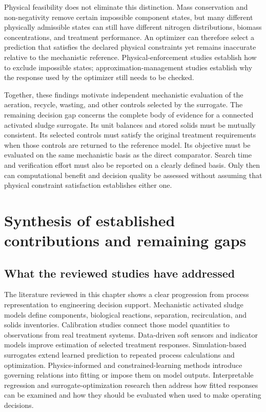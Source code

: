 Physical feasibility does not eliminate this distinction. Mass conservation and non-negativity remove certain impossible component states, but many different physically admissible states can still have different nitrogen distributions, biomass concentrations, and treatment performance. An optimizer can therefore select a prediction that satisfies the declared physical constraints yet remains inaccurate relative to the mechanistic reference. Physical-enforcement studies establish how to exclude impossible states; approximation-management studies establish why the response used by the optimizer still needs to be checked.

Together, these findings motivate independent mechanistic evaluation of the aeration, recycle, wasting, and other controls selected by the surrogate. The remaining decision gap concerns the complete body of evidence for a connected activated sludge surrogate. Its unit balances and stored solids must be mutually consistent. Its selected controls must satisfy the original treatment requirements when those controls are returned to the reference model. Its objective must be evaluated on the same mechanistic basis as the direct comparator. Search time and verification effort must also be reported on a clearly defined basis. Only then can computational benefit and decision quality be assessed without assuming that physical constraint satisfaction establishes either one.

\section{Synthesis of established contributions and remaining gaps}

\subsection{What the reviewed studies have addressed}

The literature reviewed in this chapter shows a clear progression from process representation to engineering decision support. Mechanistic activated sludge models define components, biological reactions, separation, recirculation, and solids inventories. Calibration studies connect those model quantities to observations from real treatment systems. Data-driven soft sensors and indicator models improve estimation of selected treatment responses. Simulation-based surrogates extend learned prediction to repeated process calculations and optimization. Physics-informed and constrained-learning methods introduce governing relations into fitting or impose them on model outputs. Interpretable regression and surrogate-optimization research then address how fitted responses can be examined and how they should be evaluated when used to make operating decisions.


